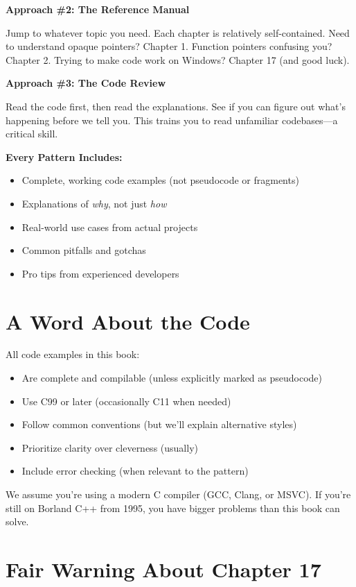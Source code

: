 \documentclass[11pt,openany]{book}
\begin{document}
\textbf{Approach \#2: The Reference Manual}

Jump to whatever topic you need. Each chapter is relatively self-contained. Need to understand opaque pointers? Chapter 1. Function pointers confusing you? Chapter 2. Trying to make code work on Windows? Chapter 17 (and good luck).

\textbf{Approach \#3: The Code Review}

Read the code first, then read the explanations. See if you can figure out what's happening before we tell you. This trains you to read unfamiliar codebases---a critical skill.

\begin{notebox}
\textbf{Every Pattern Includes:}
\begin{itemize}
    \item Complete, working code examples (not pseudocode or fragments)
    \item Explanations of \textit{why}, not just \textit{how}
    \item Real-world use cases from actual projects
    \item Common pitfalls and gotchas
    \item Pro tips from experienced developers
\end{itemize}
\end{notebox}

\section*{A Word About the Code}

All code examples in this book:
\begin{itemize}
    \item Are complete and compilable (unless explicitly marked as pseudocode)
    \item Use C99 or later (occasionally C11 when needed)
    \item Follow common conventions (but we'll explain alternative styles)
    \item Prioritize clarity over cleverness (usually)
    \item Include error checking (when relevant to the pattern)
\end{itemize}

We assume you're using a modern C compiler (GCC, Clang, or MSVC). If you're still on Borland C++ from 1995, you have bigger problems than this book can solve.

\section*{Fair Warning About Chapter 17}
\end{document}
